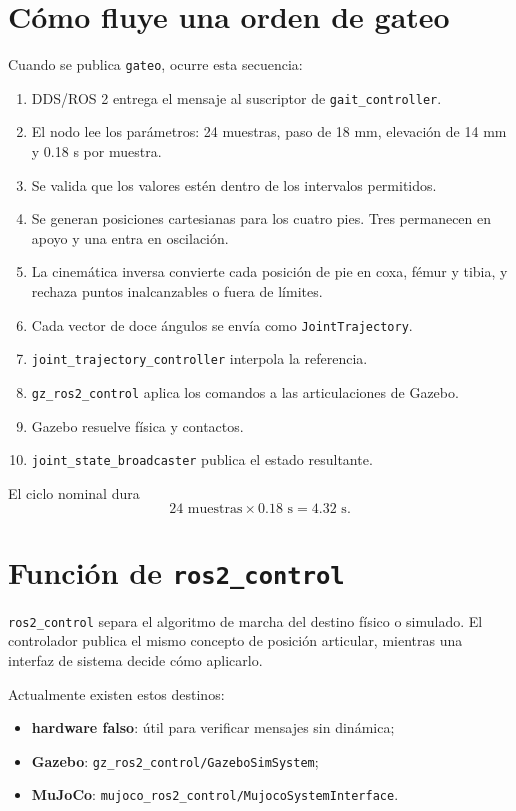 \documentclass[11pt,a4paper]{article}
\begin{document}
\section{Cómo fluye una orden de gateo}
Cuando se publica \texttt{gateo}, ocurre esta secuencia:
\begin{enumerate}
\item DDS/ROS 2 entrega el mensaje al suscriptor de
  \texttt{gait\_controller}.
\item El nodo lee los parámetros: 24 muestras, paso de 18 mm, elevación de
  14 mm y 0.18 s por muestra.
\item Se valida que los valores estén dentro de los intervalos permitidos.
\item Se generan posiciones cartesianas para los cuatro pies. Tres permanecen
  en apoyo y una entra en oscilación.
\item La cinemática inversa convierte cada posición de pie en coxa, fémur y
  tibia, y rechaza puntos inalcanzables o fuera de límites.
\item Cada vector de doce ángulos se envía como \texttt{JointTrajectory}.
\item \texttt{joint\_trajectory\_controller} interpola la referencia.
\item \texttt{gz\_ros2\_control} aplica los comandos a las articulaciones de
  Gazebo.
\item Gazebo resuelve física y contactos.
\item \texttt{joint\_state\_broadcaster} publica el estado resultante.
\end{enumerate}

El ciclo nominal dura
\[
24\text{ muestras}\times0.18\text{ s}=4.32\text{ s}.
\]

\section{Función de \texttt{ros2\_control}}
\texttt{ros2\_control} separa el algoritmo de marcha del destino físico o
simulado. El controlador publica el mismo concepto de posición articular,
mientras una interfaz de sistema decide cómo aplicarlo.

Actualmente existen estos destinos:
\begin{itemize}
\item \textbf{hardware falso}: útil para verificar mensajes sin dinámica;
\item \textbf{Gazebo}: \texttt{gz\_ros2\_control/GazeboSimSystem};
\item \textbf{MuJoCo}: \texttt{mujoco\_ros2\_control/MujocoSystemInterface}.
\end{itemize}
\end{document}
